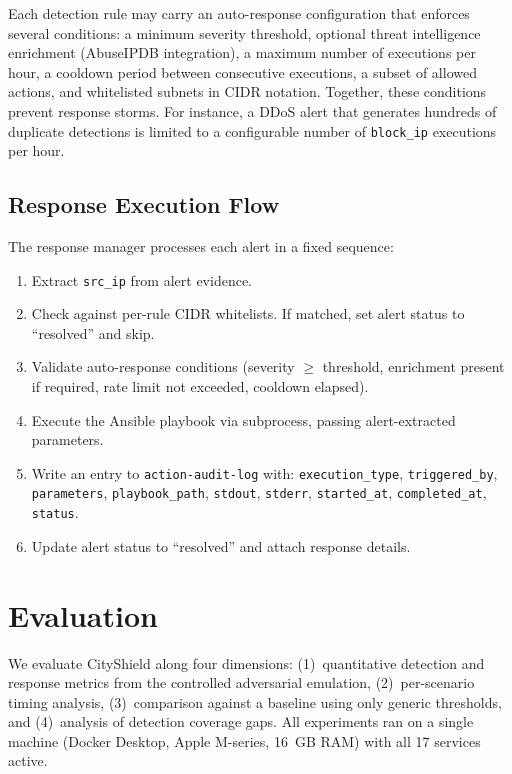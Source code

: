 \documentclass[conference,10pt]{IEEEtran}
\begin{document}
Each detection rule may carry an auto-response configuration that enforces several conditions: a minimum severity threshold, optional threat intelligence enrichment (AbuseIPDB integration), a maximum number of executions per hour, a cooldown period between consecutive executions, a subset of allowed actions, and whitelisted subnets in CIDR notation. Together, these conditions prevent response storms. For instance, a DDoS alert that generates hundreds of duplicate detections is limited to a configurable number of \texttt{block\_ip} executions per hour.

\subsection{Response Execution Flow}

The response manager processes each alert in a fixed sequence:
\begin{enumerate}[leftmargin=*,nosep]
    \item Extract \texttt{src\_ip} from alert evidence.
    \item Check against per-rule CIDR whitelists. If matched, set alert status to ``resolved'' and skip.
    \item Validate auto-response conditions (severity $\geq$ threshold, enrichment present if required, rate limit not exceeded, cooldown elapsed).
    \item Execute the Ansible playbook via subprocess, passing alert-extracted parameters.
    \item Write an entry to \texttt{action-audit-log} with: \texttt{execution\_type}, \texttt{triggered\_by}, \texttt{parameters}, \texttt{playbook\_path}, \texttt{stdout}, \texttt{stderr}, \texttt{started\_at}, \texttt{completed\_at}, \texttt{status}.
    \item Update alert status to ``resolved'' and attach response details.
\end{enumerate}

\section{Evaluation}
\label{sec:evaluation}

We evaluate CityShield along four dimensions: (1)~quantitative detection and response metrics from the controlled adversarial emulation, (2)~per-scenario timing analysis, (3)~comparison against a baseline using only generic thresholds, and (4)~analysis of detection coverage gaps. All experiments ran on a single machine (Docker Desktop, Apple M-series, 16~GB RAM) with all 17 services active.
\end{document}

